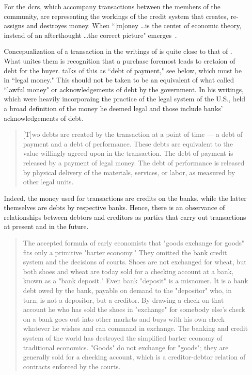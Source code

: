 For \citeauthor{commons1951} the \acfp{dcr}, which accompany transactions between the members of the community, are representing the workings of the credit system that creates, re-assigns and destroyes money. When ``[m]oney \dots is the center of economic theory, instead of an afterthought \dots the correct picture" emerges~\citep[pp.~643-644,646]{commons1923}.

Concepualization of a transaction in the writings of \citeauthor{commons1951} is quite close to that of \citeauthor{innes1913}. What unites them is recognition that a purchase foremost leads to cretaion of debt for the buyer. \citeauthor{commons1951} talks of this as ``debt of payment," see below, which must be in ``legal money." This should not be taken to be an equivalent of what \citeauthor{innes1913} called ``lawful money" or acknowledgements of debt by the government. In his writings, which were heavily incorporaing the practice of the legal system of the U.S., \citeauthor{commons1951} held a broad definition of the money he deemed legal and those include banks' acknowledgements of debt.

\begin{quote}
[T]wo debts are created by the transaction at a point of time --- a debt
 of payment and a debt of performance. These debts are equivalent to the value willingly
 agreed upon in the transaction. The debt of payment is released by a payment of legal
 money. The debt of performance is released by physical delivery of the materials, services,
 or labor, as measured by other legal units. \citep[p.~241, footnote 7]{commons1936}
 \end{quote}
 
Indeed, the money used for transactions are credits on the banks, while the latter themselves are debts by respective banks. Hence, there is an observance of relationships between debtors and creditors as parties that carry out transactions at present and in the future. 
 
\begin{quote}
The accepted formula of early economists that "goods exchange for goods" fits only a primitive "barter economy." They omitted the bank credit system and the decisions of courts. Shoes are not exchanged for wheat, but both shoes and wheat are today sold for a checking account at a bank, known as a "bank deposit." Even bank "deposit" is a misnomer. It is a bank debt owed by the bank, payable on demand to the "depositor" who, in turn, is not a depositor, but a creditor. By drawing a check on that account he who has sold the shoes in "exchange" for somebody else's check on a bank goes out into other markets and buys with his own check whatever he wishes and can command in exchange. The banking and credit system of the world has destroyed the simplified barter economy of traditional economics. "Goods" do not exchange for "goods"; they are generally sold for a checking account, which is a creditor-debtor relation of contracts enforced by the courts.~\citep[p.~45]{commons1951}
\end{quote}
 
